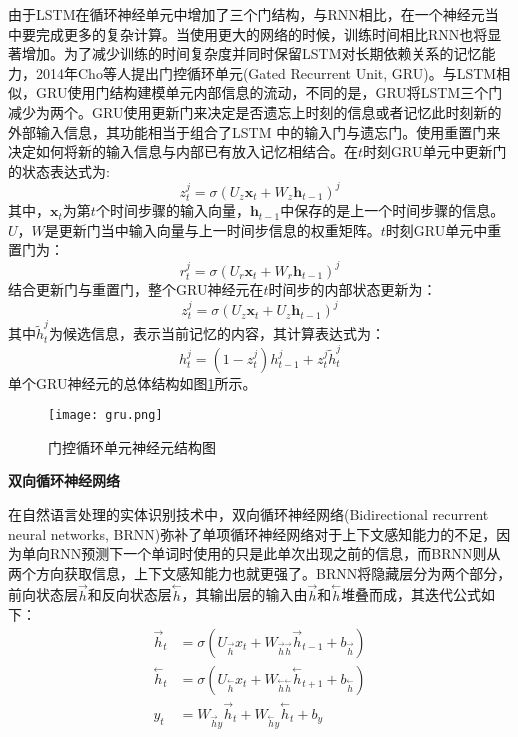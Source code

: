 由于LSTM在循环神经单元中增加了三个门结构，与RNN相比，在一个神经元当中要完成更多的复杂计算。当使用更大的网络的时候，训练时间相比RNN也将显著增加。为了减少训练的时间复杂度并同时保留LSTM对长期依赖关系的记忆能力，2014年Cho等人提出门控循环单元(Gated Recurrent Unit, GRU)。与LSTM相似，GRU使用门结构建模单元内部信息的流动，不同的是，GRU将LSTM三个门减少为两个。GRU使用更新门来决定是否遗忘上时刻的信息或者记忆此时刻新的外部输入信息，其功能相当于组合了LSTM 中的输入门与遗忘门。使用重置门来决定如何将新的输入信息与内部已有放入记忆相结合。在$t$时刻GRU单元中更新门的状态表达式为:
$$
z_{t}^{j}=\sigma\left(U_{z} \mathbf{x}_{t}+W_{z} \mathbf{h}_{t-1}\right)^{j}
$$
其中，$\mathbf{x}_{t}$为第$t$个时间步骤的输入向量，$\mathbf{h}_{t-1}$中保存的是上一个时间步骤的信息。$U$，$W$是更新门当中输入向量与上一时间步信息的权重矩阵。$t$时刻GRU单元中重置门为：
$$
r_{t}^{j}=\sigma\left(U_{r} \mathbf{x}_{t}+W_{r} \mathbf{h}_{t-1}\right)^{j}
$$
结合更新门与重置门，整个GRU神经元在$t$时间步的内部状态更新为：
$$
z_{t}^{j}=\sigma\left(U_{z} \mathbf{x}_{t}+U_{z} \mathbf{h}_{t-1}\right)^{j}
$$
其中$\tilde{h}_{t}^{j}$为候选信息，表示当前记忆的内容，其计算表达式为：
$$
h_{t}^{j}=\left(1-z_{t}^{j}\right) h_{t-1}^{j}+z_{t}^{j} \tilde{h}_{t}^{j}
$$
单个GRU神经元的总体结构如图\ref{fig:gru}所示。

\begin{figure}[htb]
  \centering
  \texttt{[image: gru.png]}\\
  \caption{门控循环单元神经元结构图}
  \label{fig:gru}
\end{figure}

\textbf{双向循环神经网络}

在自然语言处理的实体识别技术中，双向循环神经网络(Bidirectional recurrent neural networks, BRNN)弥补了单项循环神经网络对于上下文感知能力的不足，因为单向RNN预测下一个单词时使用的只是此单次出现之前的信息，而BRNN则从两个方向获取信息，上下文感知能力也就更强了。BRNN将隐藏层分为两个部分，前向状态层$\stackrel{\rightarrow}{h}$和反向状态层$\stackrel{\leftarrow}{h}$，其输出层的输入由$\stackrel{\rightarrow}{h}$和$\stackrel{\leftarrow}{h}$堆叠而成，其迭代公式如下：
\begin{align} 
  \vec{h}_{t} &= \sigma(U_{\vec{h}} x_{t}+W_{\vec{h} \vec{h}} \vec{h}_{t-1}+b_{\vec{h}}) \label{forword}\\
\stackrel{\leftarrow}{h}_{t} &= \sigma(U_{\stackrel{\leftarrow}{h}} x_{t}+W_{\stackrel{\leftarrow}{h} \stackrel{\leftarrow}{h}} \stackrel{\leftarrow}{h}_{t+1}+b_{\stackrel{\leftarrow}{h}}) \label{backword}\\
y_{t} &= W_{\vec{h} y} \vec{h}_{t}+W_{\stackrel{\leftarrow}{h}y} \stackrel{\leftarrow}{h}_{t}+b_{y} \label{stack}
  \end{align}

